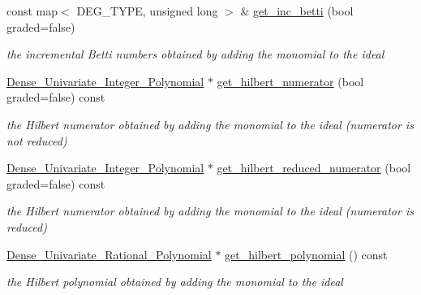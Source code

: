 \begin{Indent}
\begin{DoxyCompactItemize}
\mbox{\label{group___g_b_computation_acc39727c4e1ef77c8fb74bca7955e9c4}} 
const map$<$ D\+E\+G\+\_\+\+T\+Y\+PE, unsigned long $>$ \& \hyperlink{group___g_b_computation_acc39727c4e1ef77c8fb74bca7955e9c4}{get\+\_\+inc\+\_\+betti} (bool graded=false)
\begin{DoxyCompactList}\small\item\em the incremental Betti numbers obtained by adding the monomial to the ideal \end{DoxyCompactList}\item 
\mbox{\label{group___g_b_computation_aaef635310e198cfa9f9da6fd50c4bc84}} 
\hyperlink{group__polygroup_class_dense___univariate___integer___polynomial}{Dense\+\_\+\+Univariate\+\_\+\+Integer\+\_\+\+Polynomial} $\ast$ \hyperlink{group___g_b_computation_aaef635310e198cfa9f9da6fd50c4bc84}{get\+\_\+hilbert\+\_\+numerator} (bool graded=false) const
\begin{DoxyCompactList}\small\item\em the Hilbert numerator obtained by adding the monomial to the ideal (numerator is {\itshape not} reduced) \end{DoxyCompactList}\item 
\mbox{\label{group___g_b_computation_af9df84889effb9b5805413e8a0affa88}} 
\hyperlink{group__polygroup_class_dense___univariate___integer___polynomial}{Dense\+\_\+\+Univariate\+\_\+\+Integer\+\_\+\+Polynomial} $\ast$ \hyperlink{group___g_b_computation_af9df84889effb9b5805413e8a0affa88}{get\+\_\+hilbert\+\_\+reduced\+\_\+numerator} (bool graded=false) const
\begin{DoxyCompactList}\small\item\em the Hilbert numerator obtained by adding the monomial to the ideal (numerator {\itshape is} reduced) \end{DoxyCompactList}\item 
\mbox{\label{group___g_b_computation_a6fa88df78315031c9bfcc58b8d8acb1a}} 
\hyperlink{group__polygroup_class_dense___univariate___rational___polynomial}{Dense\+\_\+\+Univariate\+\_\+\+Rational\+\_\+\+Polynomial} $\ast$ \hyperlink{group___g_b_computation_a6fa88df78315031c9bfcc58b8d8acb1a}{get\+\_\+hilbert\+\_\+polynomial} () const
\begin{DoxyCompactList}\small\item\em the Hilbert polynomial obtained by adding the monomial to the ideal \end{DoxyCompactList}\item 

\end{DoxyCompactItemize}
\end{Indent}
